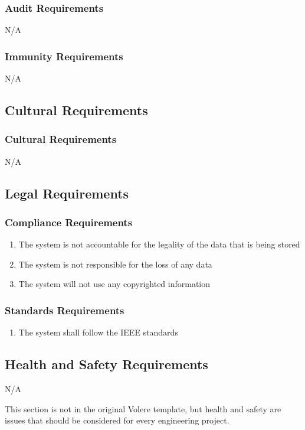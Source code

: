 \documentclass[12pt, titlepage]{article}
\begin{document}
	\subsubsection{Audit Requirements}
	N/A
	
	\subsubsection{Immunity Requirements}
	N/A
	
	\subsection{Cultural Requirements}
	\subsubsection{Cultural Requirements}
	N/A
	
	\subsection{Legal Requirements}
	\subsubsection{Compliance Requirements}
	\begin{enumerate}[resume*]
		\item The system is not accountable for the legality of the data that is being stored
		\item The system is not responsible for the loss of any data
		\item The system will not use any copyrighted information
	\end{enumerate}
	\subsubsection{Standards Requirements}
	\begin{enumerate}[resume*]
		\item The system shall follow the IEEE standards
	\end{enumerate}
	\subsection{Health and Safety Requirements}
	N/A
	
	This section is not in the original Volere template, but health and safety are
	issues that should be considered for every engineering project.
	
\end{document}
